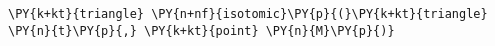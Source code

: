 \begin{Verbatim}[commandchars=\\\{\}]
    \PY{k+kt}{triangle} \PY{n+nf}{isotomic}\PY{p}{(}\PY{k+kt}{triangle} \PY{n}{t}\PY{p}{,} \PY{k+kt}{point} \PY{n}{M}\PY{p}{)}
\end{Verbatim}
